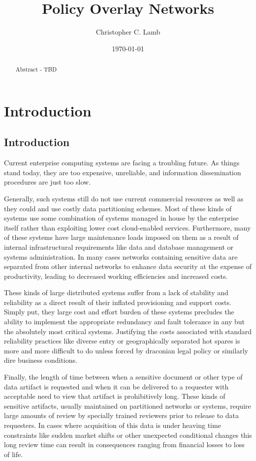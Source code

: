 \documentclass[12pt,letterpaper]{report}
\author{Christopher C. Lamb}
\title{Policy Overlay Networks}
\date{\today}
\begin{document}
\maketitle

\doublespacing

\begin{abstract}
Abstract - TBD
\end{abstract}

\chapter{Introduction}

\section{Introduction}
Current enterprise computing systems are facing a troubling future.  As things stand today, they are too expensive, unreliable, and information dissemination procedures are just too slow.

Generally, such systems still do not use current commercial resources as well as they could and use costly data partitioning schemes.  Most of these kinds of systems use some combination of systems managed in house by the enterprise itself rather than exploiting lower cost cloud-enabled services.  Furthermore, many of these systems have large maintenance loads imposed on them as a result of internal infrastructural requirements like data and database management or systems administration.  In many cases networks containing sensitive data are separated from other internal networks to enhance data security at the expense of productivity, leading to decreased working efficiencies and increased costs.

These kinds of large distributed systems suffer from a lack of stability and reliability as a direct result of their inflated provisioning and support costs.  Simply put, they large cost and effort burden of these systems precludes the ability to implement the appropriate redundancy and fault tolerance in any but the absolutely most critical systems.  Justifying the costs associated with standard reliability practices like diverse entry or geographically separated hot spares is more and more difficult to do unless forced by draconian legal policy or similarly dire business conditions.

Finally, the length of time between when a sensitive document or other type of data artifact is requested and when it can be delivered to a requester with acceptable need to view that artifact is prohibitively long.  These kinds of sensitive artifacts, usually maintained on partitioned networks or systems, require large amounts of review by specially trained reviewers prior to release to data requesters.  In cases where acquisition of this data is under heaving time constraints like sudden market shifts or other unexpected conditional changes this long review time can result in consequences ranging from financial losses to loss of life.
\end{document}

